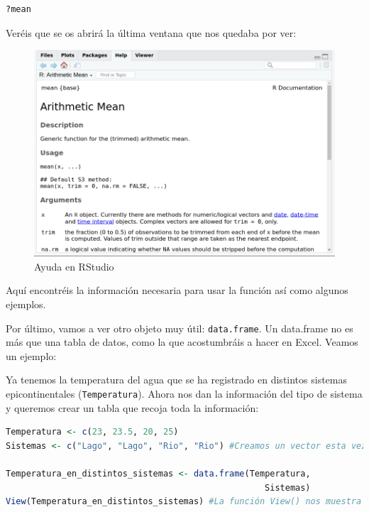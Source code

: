 \documentclass[
]{book}
\newcommand{\passthrough}[1]{#1}
\begin{document}
\begin{lstlisting}[language=R]
?mean
\end{lstlisting}

Veréis que se os abrirá la última ventana que nos quedaba por ver:

\begin{figure}

{\centering \includegraphics[width=1\linewidth]{Img/Help_R_2} 

}

\caption{Ayuda en RStudio}\label{fig:unnamed-chunk-20}
\end{figure}

Aquí encontréis la información necesaria para usar la función así como algunos ejemplos.

Por último, vamos a ver otro objeto muy útil: \passthrough{\lstinline!data.frame!}. Un data.frame no es más que una tabla de datos, como la que acostumbráis a hacer en Excel. Veamos un ejemplo:

Ya tenemos la temperatura del agua que se ha registrado en distintos sistemas epicontinentales (\passthrough{\lstinline!Temperatura!}). Ahora nos dan la información del tipo de sistema y queremos crear un tabla que recoja toda la información:

\begin{lstlisting}[language=R]
Temperatura <- c(23, 23.5, 20, 25)
Sistemas <- c("Lago", "Lago", "Rio", "Rio") #Creamos un vector esta vez de tipo caracter (el texto va entre comillas)

Temperatura_en_distintos_sistemas <- data.frame(Temperatura,
                                                   Sistemas)
View(Temperatura_en_distintos_sistemas) #La función View() nos muestra el objeto que deseemos.
\end{lstlisting}
\end{document}
